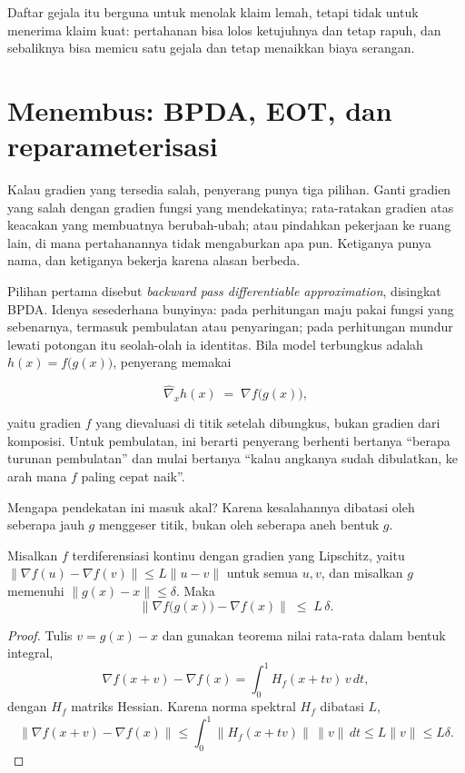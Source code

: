 Daftar gejala itu berguna untuk menolak klaim lemah, tetapi tidak untuk menerima klaim
kuat: pertahanan bisa lolos ketujuhnya dan tetap rapuh, dan sebaliknya bisa memicu satu
gejala dan tetap menaikkan biaya serangan.


\section{Menembus: BPDA, EOT, dan reparameterisasi}

Kalau gradien yang tersedia salah, penyerang punya tiga pilihan. Ganti gradien yang salah
dengan gradien fungsi yang mendekatinya; rata-ratakan gradien atas keacakan yang membuatnya
berubah-ubah; atau pindahkan pekerjaan ke ruang lain, di mana pertahanannya tidak
mengaburkan apa pun. Ketiganya punya nama, dan ketiganya bekerja karena alasan berbeda.

Pilihan pertama disebut \emph{backward pass differentiable approximation}, disingkat
BPDA. Idenya sesederhana bunyinya: pada perhitungan maju pakai fungsi yang sebenarnya,
termasuk pembulatan atau penyaringan; pada perhitungan mundur lewati potongan itu
seolah-olah ia identitas. Bila model terbungkus adalah $h(x)=f\bigl(g(x)\bigr)$,
penyerang memakai

\begin{equation}
\widehat{\nabla}_x h(x) \;=\; \nabla f\bigl(g(x)\bigr),
\end{equation}

yaitu gradien $f$ yang dievaluasi di titik setelah dibungkus, bukan gradien dari
komposisi. Untuk pembulatan, ini berarti penyerang berhenti bertanya ``berapa turunan
pembulatan'' dan mulai bertanya ``kalau angkanya sudah dibulatkan, ke arah mana $f$
paling cepat naik''.

Mengapa pendekatan ini masuk akal? Karena kesalahannya dibatasi oleh seberapa jauh $g$
menggeser titik, bukan oleh seberapa aneh bentuk $g$.

\begin{proposisi}
Misalkan $f$ terdiferensiasi kontinu dengan gradien yang Lipschitz, yaitu
$\lVert \nabla f(u)-\nabla f(v)\rVert \le L\lVert u-v\rVert$ untuk semua $u,v$, dan
misalkan $g$ memenuhi $\lVert g(x)-x\rVert\le\delta$. Maka
\begin{equation}
\bigl\lVert \nabla f\bigl(g(x)\bigr)-\nabla f(x)\bigr\rVert \;\le\; L\,\delta .
\end{equation}
\end{proposisi}

\begin{proof}
Tulis $v=g(x)-x$ dan gunakan teorema nilai rata-rata dalam bentuk integral,
\begin{equation}
\nabla f(x+v)-\nabla f(x) = \int_0^1 H_f(x+tv)\,v\,dt,
\end{equation}
dengan $H_f$ matriks Hessian. Karena norma spektral $H_f$ dibatasi $L$,
\begin{equation}
\bigl\lVert \nabla f(x+v)-\nabla f(x)\bigr\rVert
\le \int_0^1 \lVert H_f(x+tv)\rVert\,\lVert v\rVert\,dt
\le L\lVert v\rVert \le L\delta .
\end{equation}
\end{proof}

